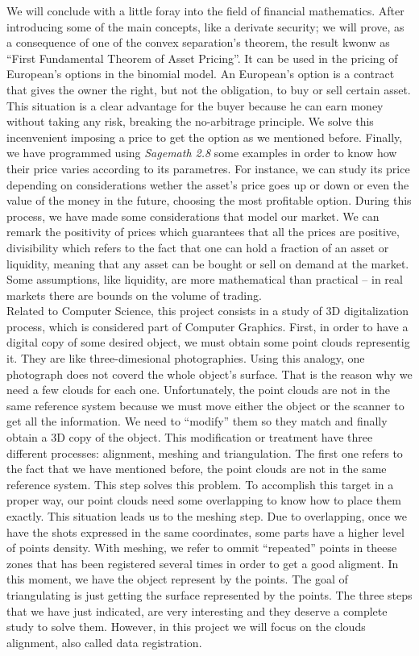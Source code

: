We will conclude with a little foray into the field of financial mathematics. After introducing some of the main concepts, like a derivate security; we will prove, as a consequence of one of the convex separation's theorem, the result kwonw as ``First Fundamental Theorem of Asset Pricing''. It can be used in the pricing of European's options in the binomial model. An European's option is a contract that gives the owner the right, but not the obligation, to buy or sell certain asset. This situation is a clear advantage for the buyer because he can earn money without taking any risk, breaking the no-arbitrage principle. We solve this incenvenient imposing a price to get the option as we mentioned before. Finally, we have programmed using \textit{Sagemath 2.8} some examples in order to know how their price varies according to its parametres. For instance, we can study its price depending on considerations wether the asset's price goes up or down or even the value of the money in the future, choosing the most profitable option. During this process, we have made some considerations that model our market. We can remark the positivity of prices which guarantees that all the prices are positive, divisibility which refers to the fact that one can hold a fraction of an asset or liquidity, meaning that any asset can be bought or sell on demand at the market. Some assumptions, like liquidity, are more mathematical than practical -- in real markets there are bounds on the volume of trading. \\

Related to Computer Science, this project consists in a study of 3D digitalization process, which is considered part of Computer Graphics. First, in order to have a digital copy of some desired object, we must obtain some point clouds representig it. They are like three-dimesional photographies. Using this analogy, one photograph does not coverd the whole object's surface. That is the reason why we need a few clouds for each one. Unfortunately, the point clouds are not in the same reference system because we must move either the object or the scanner to get all the information. We need to ``modify'' them so they match and finally obtain a 3D copy of the object. This modification or treatment have three different processes: alignment, meshing and triangulation. The first one refers to the fact that we have mentioned before, the point clouds are not in the same reference system. This step solves this problem. To accomplish this target in a proper way, our point clouds need some overlapping to know how to place them exactly. This situation leads us to the meshing step. Due to overlapping, once we have the shots expressed in the same coordinates, some parts have a higher level of points density. With meshing, we refer to ommit ``repeated'' points in theese zones that has been registered several times in order to get a good aligment. In this moment, we have the object represent by the points. The goal of triangulating is just getting the surface represented by the points. The three steps that we have just indicated, are very interesting and they deserve a complete study to solve them. However, in this project we will focus on the clouds alignment, also called data registration. \\

